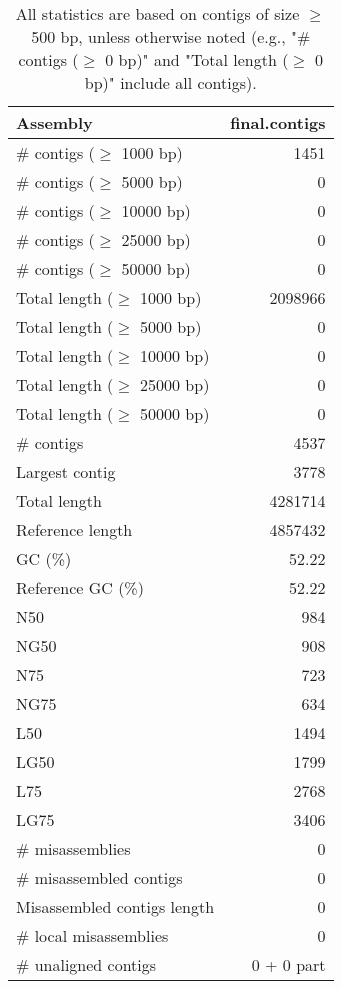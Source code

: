 \documentclass[12pt,a4paper]{article}
\begin{document}
\begin{table}[ht]
\begin{center}
\caption{All statistics are based on contigs of size $\geq$ 500 bp, unless otherwise noted (e.g., "\# contigs ($\geq$ 0 bp)" and "Total length ($\geq$ 0 bp)" include all contigs).}
\begin{tabular}{|l*{1}{|r}|}
\hline
Assembly & final.contigs \\ \hline
\# contigs ($\geq$ 1000 bp) & 1451 \\ \hline
\# contigs ($\geq$ 5000 bp) & 0 \\ \hline
\# contigs ($\geq$ 10000 bp) & 0 \\ \hline
\# contigs ($\geq$ 25000 bp) & 0 \\ \hline
\# contigs ($\geq$ 50000 bp) & 0 \\ \hline
Total length ($\geq$ 1000 bp) & 2098966 \\ \hline
Total length ($\geq$ 5000 bp) & 0 \\ \hline
Total length ($\geq$ 10000 bp) & 0 \\ \hline
Total length ($\geq$ 25000 bp) & 0 \\ \hline
Total length ($\geq$ 50000 bp) & 0 \\ \hline
\# contigs & 4537 \\ \hline
Largest contig & 3778 \\ \hline
Total length & 4281714 \\ \hline
Reference length & 4857432 \\ \hline
GC (\%) & 52.22 \\ \hline
Reference GC (\%) & 52.22 \\ \hline
N50 & 984 \\ \hline
NG50 & 908 \\ \hline
N75 & 723 \\ \hline
NG75 & 634 \\ \hline
L50 & 1494 \\ \hline
LG50 & 1799 \\ \hline
L75 & 2768 \\ \hline
LG75 & 3406 \\ \hline
\# misassemblies & 0 \\ \hline
\# misassembled contigs & 0 \\ \hline
Misassembled contigs length & 0 \\ \hline
\# local misassemblies & 0 \\ \hline
\# unaligned contigs & 0 + 0 part \\ \hline

\end{tabular}
\end{center}
\end{table}
\end{document}
